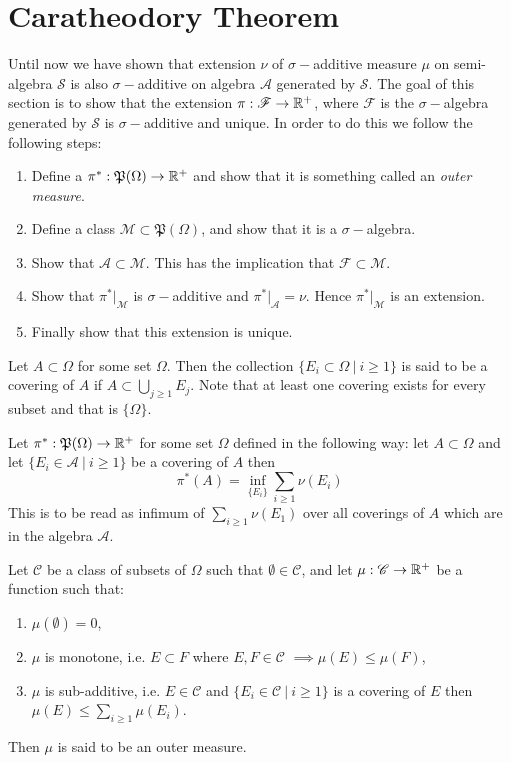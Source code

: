 \section{Caratheodory Theorem}
 Until now we have shown that extension $\nu$ of $\sigma-$additive measure $\mu$ on semi-algebra $ \mathscr{S}$ is also $\sigma-$additive on algebra $ \mathscr{A}$ generated by $ \mathscr{S}$. The goal of this section is to show that the extension $\pi: \mathscr{F}\to \mathbb{R}^+$, where $ \mathscr{F}$ is the $\sigma-$algebra generated by $ \mathscr{S}$ is $\sigma-$additive and unique. In order to do this we follow the following steps:
 \begin{enumerate}
   \item Define a $\pi^*: \mathfrak{P} (\Omega) \to \mathbb{R}^+$ and show that it is something called an \textit{outer measure}.
   \item Define a class $ \mathscr{M} \subset \mathfrak{P} (\Omega)$, and show that it is a $\sigma-$algebra.
   \item Show that $ \mathscr{A} \subset \mathscr{M}$. This has the implication that $ \mathscr{F} \subset \mathscr{M}$.
   \item Show that $\pi^*|_{ \mathscr{M} }$ is $\sigma-$additive and $\pi^*|_{ \mathscr{A} } = \nu$. Hence $\pi^*|_{ \mathscr{M} }$ is an extension.
   \item Finally show that this extension is unique.
 \end{enumerate}
 \begin{definition}
   Let $A \subset \Omega$ for some set $\Omega$. Then the collection $\{E_i\subset \Omega\ |\ i\geq 1\}$ is said to be a covering of $A$ if $A\subset \bigcup_{j\geq 1} E_j$. Note that at least one covering exists for every subset and that is $\{\Omega\}$.
 \end{definition}
 \begin{definition}
   Let $\pi^*: \mathfrak{P} (\Omega) \to \mathbb{R}^+$ for some set $\Omega$ defined in the following way: let $A \subset \Omega$ and let $\{E_i\in \mathscr{A}\ |\ i\geq 1\}$ be a covering of $A$ then
   \[\pi^*(A) = \inf_{\{E_i\}} \sum_{i\geq 1} \nu(E_i)\]
   This is to be read as infimum of $\sum_{i\geq 1} \nu(E_1)$ over all coverings of $A$ which are in the algebra $ \mathscr{A}$. 
 \end{definition}
 \begin{definition}
   Let $ \mathscr{C}$ be a class of subsets of $\Omega$ such that $\emptyset \in \mathscr{C}$, and let $\mu: \mathscr{C} \to \mathbb{R}^+$ be a function such that:
   \begin{enumerate}
     \item $\mu(\emptyset) = 0$,
     \item $\mu$ is monotone, i.e. $E\subset F$ where $E,F\in \mathscr{C}$ $\implies \mu(E)\leq \mu(F)$,
     \item $\mu$ is sub-additive, i.e. $E \in \mathscr{C}$ and $\{E_i\in \mathscr{C}\ |\ i\geq 1\}$ is a covering of $E$ then $\mu(E) \leq \sum_{i\geq 1} \mu(E_i)$.
   \end{enumerate}
   Then $\mu$ is said to be an outer measure. 
 \end{definition}
